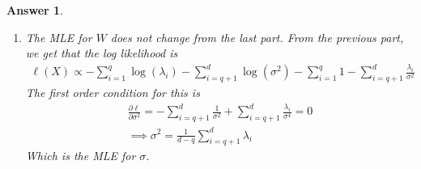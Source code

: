 \documentclass[12pt]{article}
\theoremstyle{colon}
\newtheorem*{answer}{Answer}
\begin{document}
\begin{answer}
\begin{enumerate}[label=\arabic*)]
\begin{gather*}
        W = U \Sigma V^T
      \end{gather*}
      Where $U$ is picked such that the first $r$ columns are eigenvectors of $\hat{\Sigma}$, the rest are arbitrary. Plugging this back into the log-likelihood, using the fact that the determinant is the product of eigenvalues, and the trace is the sum of eigenvalues,
      \begin{gather*}
        \ell(X) \propto - \log \lvert W W^T + \sigma^2 I_d \rvert - \text{Tr} \left(\hat{\Sigma} (W W^T + \sigma^2 I_d)^{-1} \right) \\
        = - \log \lvert U \Sigma^2 U^T + \sigma^2 I_d \rvert - \text{Tr} \left( \hat{\Sigma} (U \Sigma^2 U^T + \sigma^2 I_d)^{-1} \right) \\
        = - \sum_{i = 1}^r \log(\lambda_i) - \sum_{i = r+1}^d \log(\sigma^2) - \sum_{i = 1}^r 1 - \sum_{i = r+1}^d \frac{\lambda_i}{\sigma^2}
      \end{gather*}
      Where the trace simplifies to the above because $\hat{\Sigma} = U \text{diag}(\lambda_1 + \mathellipsis, \lambda_r, \sigma^2, \mathellipsis, \sigma^2) U^T$. Therefore, we must pick a suitable $r$ that maximizes this. Noting that $-\log(\lambda_i) + \log(\sigma^2) \geq 1 - \frac{\lambda_i}{\sigma^2}$ from log inequalities, we want to maximize $r$ to maximize likelihood, thus $r = q$. Then pick $W$ to be the SVD with $U$ having $q$ eigenvector columns of $\hat{\Sigma}$.

    \item The MLE for $W$ does not change from the last part. From the previous part, we get that the log likelihood is
      \begin{gather*}
        \ell(X) \propto - \sum_{i = 1}^q \log(\lambda_i) - \sum_{i = q+1}^d \log(\sigma^2) - \sum_{i = 1}^q 1 - \sum_{i = q+1}^d \frac{\lambda_i}{\sigma^2}
      \end{gather*}
      The first order condition for this is
      \begin{gather*}
        \frac{\partial \ell}{\partial \sigma^2} = - \sum_{i = q+1}^d \frac{1}{\sigma^2} + \sum_{i = q+1}^d \frac{\lambda_i}{\sigma^4} = 0 \\
        \implies \sigma^2 = \frac{1}{d-q} \sum_{i = q+1}^d \lambda_i
      \end{gather*}
      Which is the MLE for $\sigma$.


\end{enumerate}
\end{answer}
\end{document}
